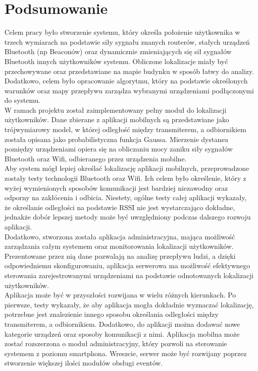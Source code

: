\section{Podsumowanie}
Celem pracy było stworzenie systemu, który określa położenie użytkownika w trzech wymiarach na podstawie siły sygnału znanych routerów, stałych urządzeń Bluetooth (np Beaconów) oraz dynamicznie zmieniających się sił sygnałów Bluetooth innych użytkowników systemu. Obliczone lokalizacje miały być przechowywane oraz przedstawiane na mapie budynku w sposób łatwy do analizy. Dodatkowo, celem było opracowanie algorytmu, który na podstawie określonych warunków oraz mapy przepływu zarządza wybranymi urządzeniami podłączonymi do systemu.\\
W ramach projektu został zaimplementowany pełny moduł do lokalizacji użytkowników. Dane zbierane z aplikacji mobilnych są przedstawiane jako trójwymiarowy model, w której odległość między transmiterem, a odbiornikiem została opisana jako probabilistyczna funkcja Gaussa. Mierzenie dystansu pomiędzy urządzeniami opiera się na obliczaniu mocy zaniku siły sygnałów Bluetooth oraz Wifi, odbieranego przez urządzenia mobilne.\\
Aby system mógł lepiej określać lokalizację aplikacji mobilnych, przeprowadzone zostały testy technologii Bluetooth oraz Wifi. Ich celem było określenie, który z wyżej wymienionych sposobów komunikacji jest bardziej niezawodny oraz odporny na zakłócenia i odbicia. Niestety, ogólne testy całej aplikacji wykazały, że określanie odległości na podstawie RSSI nie jest wystarczająco dokładne, jednakże dobór lepszej metody może być uwzględniony podczas dalszego rozwoju aplikacji.\\
Dodatkowo, stworzona została aplikacja administracyjna, mająca możliwość zarządzania całym systemem oraz monitorowania lokalizacji użytkowników. Prezentowane przez nią dane pozwalają na analizę przepływu ludzi, a dzięki odpowiedniemu skonfigurowaniu, aplikacja serwerowa ma możliwość efektywnego sterowania zarejestrowanymi urządzeniami na podstawie odnotowanych lokalizacji użytkowników.\\
Aplikacja może być w przyszłości rozwijana w wielu różnych kierunkach. Po pierwsze, testy wykazały, że aby aplikacja mogła dokładnie wyznaczać lokalizację, potrzebne jest znalezienie innego sposobu określania odległości między transmiterem, a odbiornikiem. Dodatkowo, do aplikacji można dodawać nowe kategorie urządzeń oraz sposoby komunikacji z nimi. Aplikacja mobilna może zostać rozszerzona o moduł administracyjny, który pozwoli na sterowanie systemem z poziomu smartphona. Wreszcie, serwer może być rozwijany poprzez  stworzenie większej ilości modułów obsługi eventów.\\



